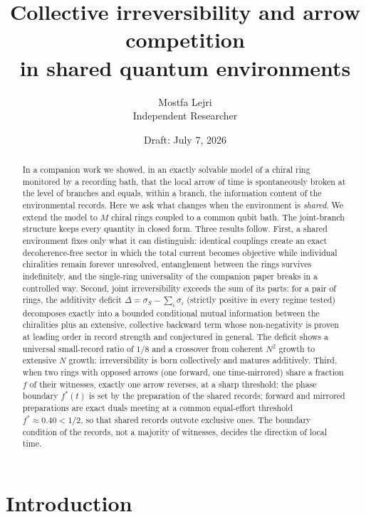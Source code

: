 \documentclass[11pt]{article}
\title{\bfseries Collective irreversibility and arrow competition\\ in shared quantum environments}
\author{Mostfa Lejri\\[2pt]
\small Independent Researcher}
\date{\small Draft: July 7, 2026}
\begin{document}
\maketitle

\begin{abstract}
\noindent
In a companion work we showed, in an exactly solvable model of a chiral ring monitored by a recording bath, that the local arrow of time is spontaneously broken at the level of branches and equals, within a branch, the information content of the environmental records. Here we ask what changes when the environment is \emph{shared}. We extend the model to $M$ chiral rings coupled to a common qubit bath. The joint-branch structure keeps every quantity in closed form. Three results follow. First, a shared environment fixes only what it can distinguish: identical couplings create an exact decoherence-free sector in which the total current becomes objective while individual chiralities remain forever unresolved, entanglement between the rings survives indefinitely, and the single-ring universality of the companion paper breaks in a controlled way. Second, joint irreversibility exceeds the sum of its parts: for a pair of rings, the additivity deficit $\Delta=\sigma_S-\sum_i\sigma_i$ (strictly positive in every regime tested) decomposes exactly into a bounded conditional mutual information between the chiralities plus an extensive, collective backward term whose non-negativity is proven at leading order in record strength and conjectured in general. The deficit shows a universal small-record ratio of $1/8$ and a crossover from coherent $N^2$ growth to extensive $N$ growth: irreversibility is born collectively and matures additively. Third, when two rings with opposed arrows (one forward, one time-mirrored) share a fraction $f$ of their witnesses, exactly one arrow reverses, at a sharp threshold: the phase boundary $f^*(t)$ is set by the preparation of the shared records; forward and mirrored preparations are exact duals meeting at a common equal-effort threshold $f^*\approx0.40<1/2$, so that shared records outvote exclusive ones. The boundary condition of the records, not a majority of witnesses, decides the direction of local time.
\end{abstract}

\tableofcontents

\section{Introduction}
\end{document}
